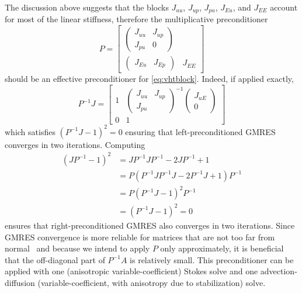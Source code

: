 The discussion above suggests that the blocks $J_{uu}$, $J_{up}$, $J_{pu}$, $J_{Eu}$, and $J_{EE}$ account for most of the linear stiffness, therefore the multiplicative preconditioner
\begin{equation}\label{eq:vht:pcnested}
  P =
  \begin{bmatrix}
    \begin{pmatrix}
      J_{uu} & J_{up} \\
      J_{pu} & 0
    \end{pmatrix} & \\
    \begin{pmatrix}
      J_{Eu} & J_{Ep}
    \end{pmatrix}
    & J_{EE}
  \end{bmatrix}
\end{equation}
should be an effective preconditioner for \eqref{eq:vhtblock}.
Indeed, if applied exactly,
\begin{equation*}
  P^{-1}J =
  \begin{bmatrix}
    1 &
    \begin{pmatrix}
      J_{uu} & J_{up} \\ J_{pu} & 
    \end{pmatrix}^{-1}
    \begin{pmatrix}
      J_{uE} \\ 0
    \end{pmatrix} \\
    0 & 1
  \end{bmatrix}
\end{equation*}
which satisfies $(P^{-1}J - 1)^2 = 0$ ensuring that left-preconditioned GMRES converges in two iterations.
Computing
\begin{align*}
  (JP^{-1} - 1)^2 & = JP^{-1}JP^{-1} - 2JP^{-1} + 1           \\
                  & = P(P^{-1}JP^{-1}J - 2P^{-1}J + 1) P^{-1} \\
                  & = P(P^{-1}J - 1)^2P^{-1}                  \\
                  & = (P^{-1}J - 1)^2 = 0
\end{align*}
ensures that right-preconditioned GMRES also converges in two iterations.
Since GMRES convergence is more reliable for matrices that are not too far from normal~\citep{nachtigal1992fnm,embree1999descriptive,trefethen2005spectra} and because we intend to apply $P$ only approximately, it is beneficial that the off-diagonal part of $P^{-1}A$ is relatively small.
This preconditioner can be applied with one (anisotropic variable-coefficient) Stokes solve and one advection-diffusion (variable-coefficient, with anisotropy due to stabilization) solve.


